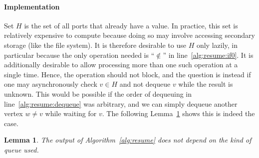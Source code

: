 \documentclass[paper=letter,fontsize=11pt,captions=tableheading]{scrartcl}
\numberwithin{equation}{section}
\theoremstyle{algorithm}
\theoremstyle{plain}
\newtheorem{lemma}[equation]{Lemma}
\theoremstyle{nonumberplain}
\begin{document}
\paragraph{Implementation}

Set $H$ is the set of all ports that already have a value. In practice, this set is relatively expensive to compute because doing so may involve accessing secondary storage (like the file system). It is therefore desirable to use $H$ only lazily, in particular because the only operation needed is ``$\notin$'' in line~\ref{alg:resume:if0}. It is additionally desirable to allow processing more than one such operation at a single time. Hence, the operation should not block, and the question is instead if one may asynchronously check $v \in H$ and not dequeue $v$ while the result is unknown. This would be possible if the order of dequeuing in line~\ref{alg:resume:dequeue} was arbitrary, and we can simply dequeue another vertex $w \neq v$ while waiting for $v$. The following Lemma~\ref{thm:resume:orderindependence} shows this is indeed the case.

\begin{lemma} \label{thm:resume:orderindependence}
	The output of Algorithm~\ref{alg:resume} does not depend on the kind of queue used.
\end{lemma}
\end{document}
